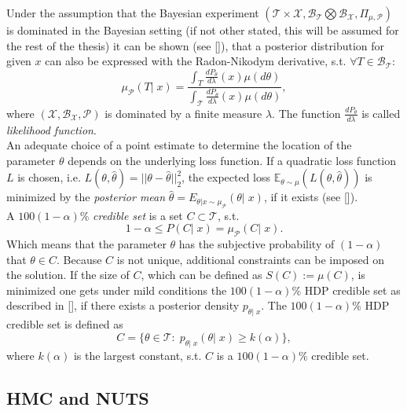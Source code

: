 \documentclass[12pt,letterpaper]{article}
\begin{document}
Under the assumption that the Bayesian experiment $(\mathcal{T}\times\mathcal{X},  \mathcal{B}_\mathcal{T}\bigotimes\mathcal{B}_\mathcal{X}, \Pi_{\mu,\mathcal{P}})$ is dominated in the Bayesian setting (if not other stated, this will be assumed for the rest of the thesis) it can be shown (see [\cite{interbayes}]), that a posterior distribution for given $x$ can also be expressed with the Radon-Nikodym derivative, s.t. $\forall T \in \mathcal{B}_\mathcal{T}:$
\begin{equation}
\label{eq:dpost}
 \mu_\mathcal{P}(T|\; x) = \frac{\int_T \frac{dP_\theta}{d\lambda}(x)\mu(d\theta)}{\int_\mathcal{T} \frac{dP_\theta}{d\lambda}(x)\mu(d\theta)},
\end{equation} 
where $(\mathcal{X}, \mathcal{B}_\mathcal{X}, \mathcal{P})$ is dominated by a finite measure $\lambda$. The function $\frac{dP_\theta}{d\lambda}$ is called \textit{likelihood function}. 
\\An adequate choice of a point estimate to determine the location of the parameter $\theta$ depends on the underlying loss function. If a quadratic loss function $L$ is chosen, i.e. $L(\theta, \hat{\theta}) = ||\theta - \hat{\theta}||_2^2$, the expected loss $\mathbb{E}_{\theta \sim \mu} (L(\theta, \hat{\theta}))$ is minimized by the \textit{posterior mean} $
	\hat{\theta} = E_{\theta |x \sim \mu_\mathcal{P}}(\theta |\; x)$, if it exists (see [\cite{statdec}]). 
\\ A $100(1-\alpha)\%$ \textit{credible set} is a set $C \subset \mathcal{T}$, s.t.
\begin{equation}
1 - \alpha \leq P(C| \;x ) = \mu_\mathcal{P}(C|\; x).
\end{equation}
Which means that the parameter $\theta$ has the subjective probability of $(1-\alpha)$ that $\theta \in C$.
Because $C$ is not unique, additional constraints can be imposed on the solution. If the size of $C$, which can be defined as  $S(C) := \mu(C)$, is minimized one gets under mild conditions the  $100(1-\alpha)\%$  HDP credible set  as described in [\cite{statdec}], if there exists a posterior density $p_{\theta|\;x}$.
The  $100(1-\alpha)\%$ HDP credible set is defined as  
\begin{equation}
C = \{\theta \in \mathcal{T}: \; p_{\theta|\;x}(\theta|\; x) \geq k(\alpha)\},
\end{equation}
where $k(\alpha)$ is the largest constant, s.t. $C$ is a $100(1-\alpha)\%$ credible set.
\subsection{HMC and NUTS}
\end{document}
